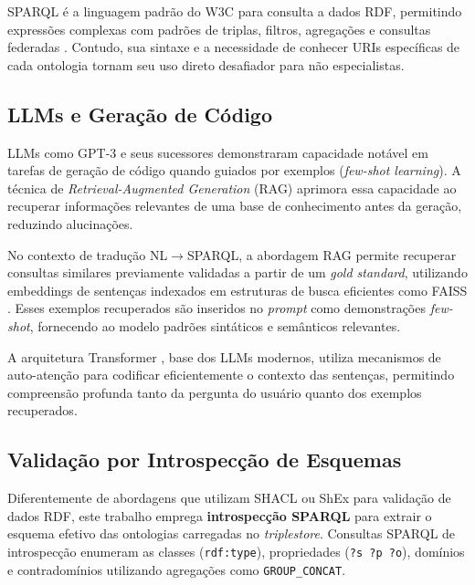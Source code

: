 \documentclass[12pt]{article}
\begin{document}
SPARQL \'{e} a linguagem padr\~{a}o do W3C para consulta a dados RDF, permitindo express\~{o}es complexas com padr\~{o}es de triplas, filtros, agrega\c{c}\~{o}es e consultas federadas \cite{harris2013sparql}. Contudo, sua sintaxe e a necessidade de conhecer URIs espec\'{i}ficas de cada ontologia tornam seu uso direto desafiador para n\~{a}o especialistas.

\subsection{LLMs e Gera\c{c}\~{a}o de C\'{o}digo}
\label{sec:llms}

LLMs como GPT-3 \cite{brown2020gpt3} e seus sucessores demonstraram capacidade not\'{a}vel em tarefas de gera\c{c}\~{a}o de c\'{o}digo quando guiados por exemplos (\textit{few-shot learning}). A t\'{e}cnica de \textit{Retrieval-Augmented Generation} (RAG) \cite{lewis2020rag} aprimora essa capacidade ao recuperar informa\c{c}\~{o}es relevantes de uma base de conhecimento antes da gera\c{c}\~{a}o, reduzindo alucina\c{c}\~{o}es.

No contexto de tradu\c{c}\~{a}o NL$\rightarrow$SPARQL, a abordagem RAG permite recuperar consultas similares previamente validadas a partir de um \textit{gold standard}, utilizando embeddings de senten\c{c}as \cite{reimers2019sbert} indexados em estruturas de busca eficientes como FAISS \cite{johnson2021faiss}. Esses exemplos recuperados s\~{a}o inseridos no \textit{prompt} como demonstra\c{c}\~{o}es \textit{few-shot}, fornecendo ao modelo padr\~{o}es sint\'{a}ticos e sem\^{a}nticos relevantes.

A arquitetura Transformer \cite{vaswani2017attention}, base dos LLMs modernos, utiliza mecanismos de auto-aten\c{c}\~{a}o para codificar eficientemente o contexto das senten\c{c}as, permitindo compreens\~{a}o profunda tanto da pergunta do usu\'{a}rio quanto dos exemplos recuperados.

\subsection{Valida\c{c}\~{a}o por Introspec\c{c}\~{a}o de Esquemas}
\label{sec:validacao}

Diferentemente de abordagens que utilizam SHACL ou ShEx para valida\c{c}\~{a}o de dados RDF, este trabalho emprega \textbf{introspec\c{c}\~{a}o SPARQL} para extrair o esquema efetivo das ontologias carregadas no \textit{triplestore}. Consultas SPARQL de introspec\c{c}\~{a}o enumeram as classes (\texttt{rdf:type}), propriedades (\texttt{?s ?p ?o}), dom\'{i}nios e contradom\'{i}nios utilizando agrega\c{c}\~{o}es como \texttt{GROUP\_CONCAT}.
\end{document}
